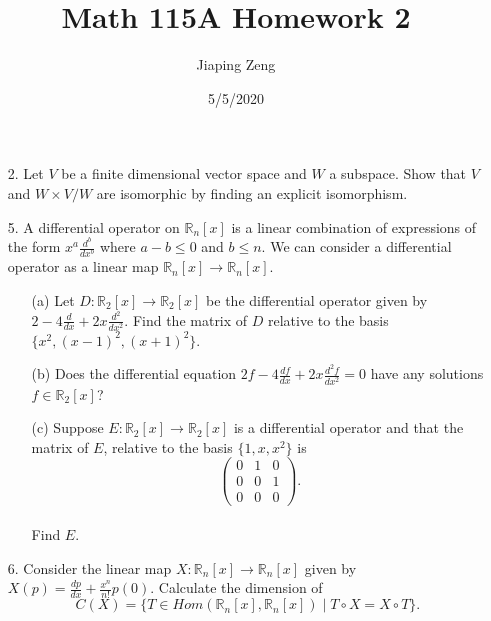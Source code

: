 \documentclass{article}
\title{Math 115A Homework 2}
\date{5/5/2020}
\author{Jiaping Zeng}
\begin{document}
\maketitle

\begin{itemize}
	\item [2.] Let $V$ be a finite dimensional vector space and $W$ a subspace. Show that $V$ and $W \times V/W$ are isomorphic by finding an explicit isomorphism.
	\item [5.] A differential operator on $\mathbb{R}_n[x]$ is a linear combination of expressions of the form $x^a\frac{d^b}{dx^b}$ where $a-b \leq 0$ and $b \leq n$. We can consider a differential operator as a linear map $\mathbb{R}_n[x]\rightarrow\mathbb{R}_n[x]$.
	      \begin{itemize}
		      \item [(a)] Let $D:\mathbb{R}_2[x]\rightarrow\mathbb{R}_2[x]$ be the differential operator given by $2-4\frac{d}{dx}+2x\frac{d^2}{dx^2}$. Find the matrix of $D$ relative to the basis $\{x^2, (x-1)^2, (x+1)^2\}$.
		      \item [(b)] Does the differential equation $2f-4\frac{df}{dx}+2x\frac{d^2f}{dx^2}=0$ have any solutions $f \in \mathbb{R}_2[x]$?
		      \item [(c)] Suppose $E:\mathbb{R}_2[x]\rightarrow\mathbb{R}_2[x]$ is a differential operator and that the matrix of $E$, relative to the basis $\{1,x,x^2\}$ is \[\begin{pmatrix}0&1&0\\0&0&1\\0&0&0\end{pmatrix}.\]\\Find $E$.
	      \end{itemize}
	\item [6.] Consider the linear map $X:\mathbb{R}_n[x]\rightarrow\mathbb{R}_n[x]$ given by $X(p)=\frac{dp}{dx}+\frac{x^n}{n!}p(0)$. Calculate the dimension of \[C(X)=\{T\in Hom(\mathbb{R}_n[x],\mathbb{R}_n[x])\mid T\circ X=X\circ T\}.\]
\end{itemize}
\end{document}
